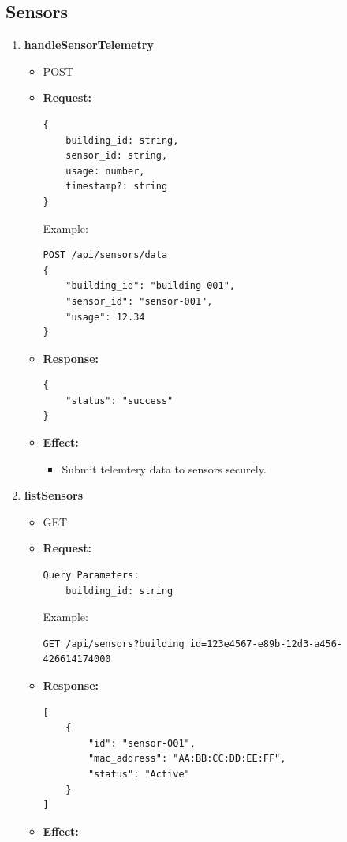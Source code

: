 \documentclass[12pt, a4paper]{article}
\begin{document}
\subsection{Sensors}
\begin{enumerate}
    \item \textbf{handleSensorTelemetry}
    \begin{itemize}
        \item POST
        \item \textbf{Request:}
        \begin{verbatim}
{
    building_id: string,
    sensor_id: string,
    usage: number,
    timestamp?: string
}
        \end{verbatim}
        Example:
        \begin{verbatim}
POST /api/sensors/data
{
    "building_id": "building-001",
    "sensor_id": "sensor-001",
    "usage": 12.34
}
        \end{verbatim}
        \item \textbf{Response:}
        \begin{verbatim}
{
    "status": "success"
}
        \end{verbatim}
        \item \textbf{Effect:}
        \begin{itemize}
            \item Submit telemtery data to sensors securely.
        \end{itemize}
    \end{itemize}
    \item \textbf{listSensors}
    \begin{itemize}
        \item GET 
        \item \textbf{Request:}
        \begin{verbatim}
Query Parameters:
    building_id: string
        \end{verbatim}
        Example:
        \begin{verbatim}
GET /api/sensors?building_id=123e4567-e89b-12d3-a456-426614174000
        \end{verbatim}
        \item \textbf{Response:}
        \begin{verbatim}
[
    {
        "id": "sensor-001",
        "mac_address": "AA:BB:CC:DD:EE:FF",
        "status": "Active"
    }
]
        \end{verbatim}
        \item \textbf{Effect:}

\end{itemize}
\end{enumerate}
\end{document}
